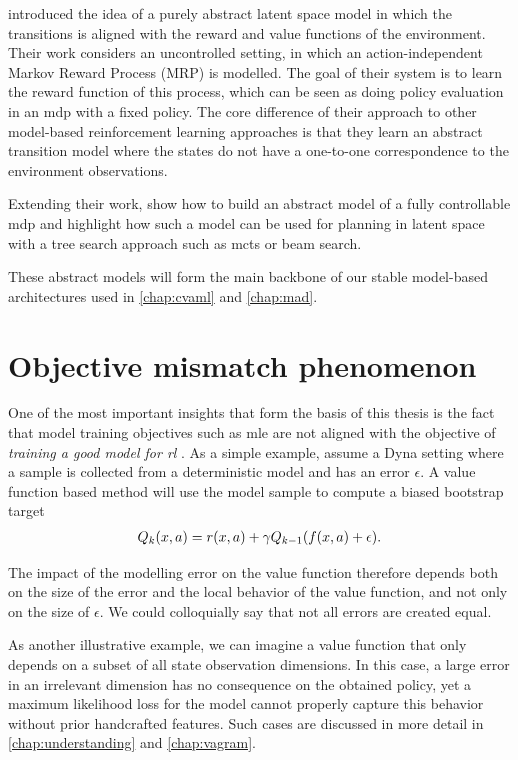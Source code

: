 \textcite{silver2017predictron} introduced the idea of a purely abstract latent space model in which the transitions is aligned with the reward and value functions of the environment.
Their work considers an uncontrolled setting, in which an action-independent Markov Reward Process (MRP) is modelled.
The goal of their system is to learn the reward function of this process, which can be seen as doing policy evaluation in an \ac{mdp}  with a fixed policy.
The core difference of their approach to other model-based reinforcement learning approaches is that they learn an abstract transition model where the states do not have a one-to-one correspondence to the environment observations.

Extending their work, \textcite{oh2017value} show how to build an abstract model of a fully controllable \ac{mdp}  and highlight how such a model can be used for planning in latent space with a tree search approach such as \ac{mcts} \parencite{schrittwieser2020mastering} or beam search.

These abstract models will form the main backbone of our stable model-based architectures used in \autoref{chap:cvaml} and \autoref{chap:mad}.

\section{Objective mismatch phenomenon}

\label{chap:background:objective}

One of the most important insights that form the basis of this thesis is the fact that model training objectives such as \ac{mle} are not aligned with the objective of \emph{training a good model for \ac{rl}} \parencite{schneider1997exploiting,joseph2013reinforcement,vaml,lambert202objective}.
As a simple example, assume a Dyna setting where a sample is collected from a deterministic model and has an error $\epsilon$.
A value function based method will use the model sample to compute a biased bootstrap target
\begin{align}
    Q_k(x,a) = r(x,a) + \gamma Q_{k-1}(f(x, a) + \epsilon).
\end{align}

The impact of the modelling error on the value function therefore depends both on the size of the error and the local behavior of the value function, and not only on the size of $\epsilon$. 
We could colloquially say that not all errors are created equal.

As another illustrative example, we can imagine a value function that only depends on a subset of all state observation dimensions. 
In this case, a large error in an irrelevant dimension has no consequence on the obtained policy, yet a maximum likelihood loss for the model cannot properly capture this behavior without prior handcrafted features.
Such cases are discussed in more detail in \autoref{chap:understanding} and \autoref{chap:vagram}.

